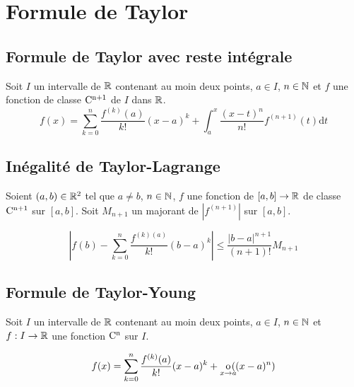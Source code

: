 \section{Formule de Taylor}

\subsection{Formule de Taylor avec reste intégrale}

\begin{prp}
Soit $I$ un intervalle de $\mathbb{R}$ contenant au moin deux points, $a \in I$,
$n \in \mathbb{N}$ et $f$ une fonction de classe $\mathrm{C^{n + 1}}$ de $I$ dans
$\mathbb{R}$.
\[
    f(x) = \sum^n_{k = 0} \frac{f^{(k)}(a)}{k!} (x - a)^k
    + \int^x_a \frac{(x - t)^n}{n!} f^{(n + 1)}(t) \mathrm{d}t
\]
\end{prp}

\subsection{Inégalité de Taylor-Lagrange}

\begin{prp}
Soient $(a, b) \in \mathbb{R}^2$ tel que $a \neq b$, $n \in \mathbb{N}$, $f$ une fonction
de $[a, b] \to \mathbb{R}$ de classe $\mathrm{C^{n + 1}}$ sur $[a, b]$. Soit $M_{n + 1}$
un majorant de $|f^{(n + 1)}|$ sur $[a, b]$.

\[
    |f(b) - \sum^n_{k = 0} \frac{f^{(k)(a)}}{k!}(b - a)^k| \leq
    \frac{|b - a|^{n + 1}}{(n + 1)!} M_{n + 1}
\]
\end{prp}

\subsection{Formule de Taylor-Young}

\begin{prp}
Soit $I$ un intervalle de $\mathbb{R}$ contenant au moin deux points, $a \in I$,
$n \in \mathbb{N}$ et $f : I \to \mathbb{R}$ une fonction $\mathrm{C^{n}}$ sur $I$.

\[
    f(x) = \sum_{k = 0}^n \frac{f^{(k)}(a)}{k!} (x - a)^k
    + \operatorname*{o}_{x \to a}\!\!\!((x - a)^n)
\]
\end{prp}


